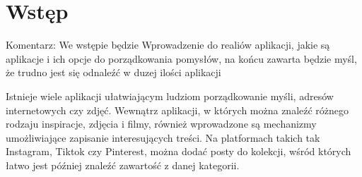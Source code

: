 \chapter{Wstęp}

Komentarz: We wstępie będzie Wprowadzenie do realiów aplikacji, 
jakie są aplikacje i ich opcje do porządkowania pomysłów, 
na końcu zawarta będzie myśl, że trudno jest się odnaleźć w duzej ilości aplikacji

Istnieje wiele aplikacji ułatwiającym ludziom porządkowanie myśli, adresów internetowych czy zdjęć. 
Wewnątrz aplikacji, w których można znaleźć różnego rodzaju inspiracje, zdjęcia i filmy, również 
wprowadzone są mechanizmy umożliwiające zapisanie interesujących treści.
Na platformach takich tak Instagram, Tiktok czy Pinterest, można dodać posty do kolekcji, 
wśród których łatwo jest później znaleźć zawartość z danej kategorii.



\cite{article}
